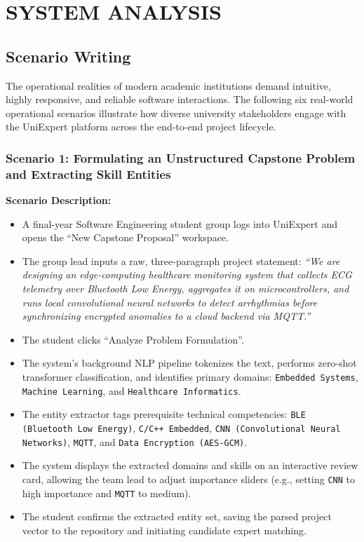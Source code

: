 \chapter{SYSTEM ANALYSIS}
\label{ch:system_analysis}

\section{Scenario Writing}
\label{sec:scenario_writing}

The operational realities of modern academic institutions demand intuitive, highly responsive, and reliable software interactions. The following six real-world operational scenarios illustrate how diverse university stakeholders engage with the UniExpert platform across the end-to-end project lifecycle.

\subsection{Scenario 1: Formulating an Unstructured Capstone Problem and Extracting Skill Entities}
\label{subsec:scenario1}

\noindent\textbf{Scenario Description:}
\begin{itemize}[label=\textbf{\tiny\ensuremath{\blacksquare}}]
    \item A final-year Software Engineering student group logs into UniExpert and opens the ``New Capstone Proposal'' workspace.
    \item The group lead inputs a raw, three-paragraph project statement: \textit{``We are designing an edge-computing healthcare monitoring system that collects ECG telemetry over Bluetooth Low Energy, aggregates it on microcontrollers, and runs local convolutional neural networks to detect arrhythmias before synchronizing encrypted anomalies to a cloud backend via MQTT.''}
    \item The student clicks ``Analyze Problem Formulation''.
    \item The system's background NLP pipeline tokenizes the text, performs zero-shot transformer classification, and identifies primary domains: \texttt{Embedded Systems}, \texttt{Machine Learning}, and \texttt{Healthcare Informatics}.
    \item The entity extractor tags prerequisite technical competencies: \texttt{BLE (Bluetooth Low Energy)}, \texttt{C/C++ Embedded}, \texttt{CNN (Convolutional Neural Networks)}, \texttt{MQTT}, and \texttt{Data Encryption (AES-GCM)}.
    \item The system displays the extracted domains and skills on an interactive review card, allowing the team lead to adjust importance sliders (e.g., setting \texttt{CNN} to high importance and \texttt{MQTT} to medium).
    \item The student confirms the extracted entity set, saving the parsed project vector to the repository and initiating candidate expert matching.
\end{itemize}

